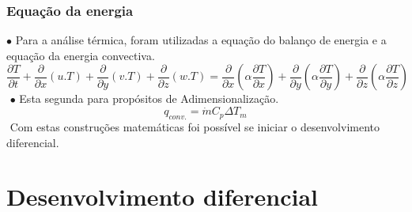 \documentclass[xcolor=dvipsnames,10pt,aspectratio=169]{beamer}
\begin{document}
	
		\begin{frame}
			\frametitle{Equação da energia}
		$\bullet$ Para a análise térmica, foram utilizadas a equação do balanço de energia e a equação da energia convectiva.
		\begin{equation}
		\frac{\partial T}{\partial t} + {\frac{\partial{}}{\partial{x}} (u.T)} + {\frac{\partial{}}{\partial{y}} (v.T)} + {\frac{\partial{}}{\partial{z}} (w.T)}
		=
		{\frac{\partial{}}{\partial{x}}} \left(\alpha {\frac{\partial{T}}{\partial{x}}} \right) +
		{\frac{\partial{}}{\partial{y}}} \left(\alpha {\frac{\partial{T}}{\partial{y}}} \right) +
		{\frac{\partial{}}{\partial{z}}} \left(\alpha {\frac{\partial{T}}{\partial{z}}} \right) 
		\end{equation}
		$ $
		$\bullet$ Esta segunda para propósitos de Adimensionalização.
		\begin{equation}\label{c_h_e}
		q_{conv.} = \dot{m} C_p \Delta T_m
		\end{equation}
		$ $
		Com estas construções matemáticas foi possível se iniciar o desenvolvimento diferencial.
		\end{frame}
	
	
	
	
	
	\section{Desenvolvimento diferencial}
		
		
		
		
		
\end{document}
